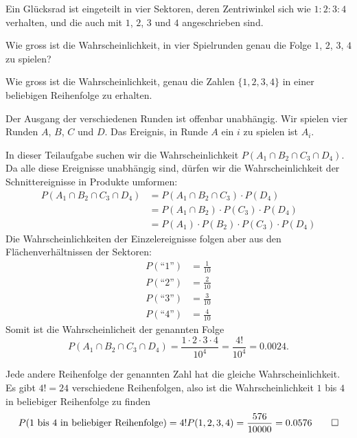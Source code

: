 Ein Glücksrad ist eingeteilt in vier Sektoren, deren Zentriwinkel
sich wie $1:2:3:4$ verhalten, und die auch mit $1$, $2$, $3$ und $4$
angeschrieben sind.
\begin{teilaufgaben}
\item Wie gross ist die Wahrscheinlichkeit, in vier Spielrunden genau die
Folge $1$, $2$, $3$, $4$ zu spielen?
\item Wie gross ist die Wahrscheinlichkeit, genau die Zahlen $\{1,2,3,4\}$
in einer beliebigen Reihenfolge zu erhalten.
\end{teilaufgaben}

\begin{loesung}
Der Ausgang der verschiedenen Runden ist offenbar unabhängig.
Wir spielen vier Runden $A$, $B$, $C$ und $D$. Das Ereignis, in
Runde $A$ ein $i$ zu spielen ist $A_i$.

\begin{teilaufgaben}
\item
In dieser Teilaufgabe suchen wir die Wahrscheinlichkeit
$P(A_1\cap B_2\cap C_3\cap D_4)$. Da alle diese Ereignisse
unabhängig sind, dürfen wir die Wahrscheinlichkeit der
Schnittereignisse in Produkte umformen:
\begin{align*}
P(A_1\cap B_2\cap C_3\cap D_4)
&=
P(A_1\cap B_2\cap C_3)\cdot P(D_4)
\\
&=
P(A_1\cap B_2)\cdot P(C_3)\cdot P(D_4)
\\
&=
P(A_1)\cdot P(B_2)\cdot P(C_3)\cdot P(D_4)
\end{align*}
Die Wahrscheinlichkeiten der Einzelereignisse folgen aber aus den
Flächenverhältnissen der Sektoren:
\begin{align*}
P(\text{``1''})&=\frac1{10}\\
P(\text{``2''})&=\frac2{10}\\
P(\text{``3''})&=\frac3{10}\\
P(\text{``4''})&=\frac4{10}
\end{align*}
Somit ist die Wahrscheinlicheit der genannten Folge
\[
P(A_1\cap B_2\cap C_3\cap D_4)
=\frac{1\cdot2\cdot 3\cdot 4}{10^4}=\frac{4!}{10^4}=0.0024.
\]
\item Jede andere Reihenfolge der genannten Zahl hat die gleiche
Wahrscheinlichkeit. Es gibt $4!=24$ verschiedene Reihenfolgen, also
ist die Wahrscheinlichkeit $1$ bis $4$ in beliebiger Reihenfolge
zu finden
\[
P(\text{$1$ bis $4$ in beliebiger Reihenfolge})=4!P(1,2,3,4)=
\frac{576}{10000}=0.0576
\qedhere
\]
\end{teilaufgaben}
\end{loesung}

